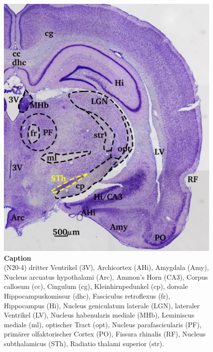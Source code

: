 \documentclass[12pt,a4paper,pdftex]{article}
\begin{document}
\begin{figure}[H]
    \centering
    \includegraphics{pictures/Basalganglia/Nucleus_subthalamus.png}
    \caption[Caption]{\textbf{Caption}\\
    (N20-4)
    dritter Ventrikel (3V), Archicortex (AHi), Amygdala (Amy), Nucleus arcuatus hypothalami (Arc), Ammon's Horn (CA3), Corpus callosum (cc), Cingulum (cg), Kleinhirnpedunkel (cp), dorsale Hippocampuskomissur (dhc), Fasciculus retroflexus (fr), Hippocampus (Hi), Nucleus geniculatum laterale (LGN), lateraler Ventrikel (LV), Nucleus habenularis mediale (MHb), Leminiscus mediale (ml), optischer Tract (opt), Nucleus parafascicularis (PF),  primärer  olfaktorischer  Cortex (PO), Fissura rhinalis (RF), Nucleus subthalamicus (STh), Radiatio thalami superior (str).}
    \label{fig:Nucleus_subthalamus}
\end{figure}
\end{document}
